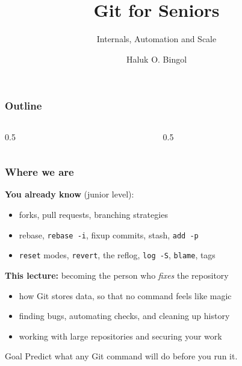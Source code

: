\documentclass[aspectratio=169,10pt,compress]{beamer}
\title{Git for Seniors}
\subtitle{Internals, Automation and Scale}
\author[Bingol]{Haluk O. Bingol}
\institute[FCIS]{
    Faculty of Computer and Information Sciences\\
    Yeditepe University
}
\date{
	{\tiny \hbTimeStamp}
}
\newcommand{\cmd}[1]{\texttt{\color{gitred}#1}}
\begin{document}
\begin{frame}[t,fragile]
  \titlepage
\end{frame}

\begin{frame}[t,fragile] \frametitle{Outline}
  \begin{columns}[T]
    \begin{column}{0.5\textwidth}
      \tableofcontents[sections={1-6}]
    \end{column}
    \begin{column}{0.5\textwidth}
      \tableofcontents[sections={7-12}]
    \end{column}
  \end{columns}
\end{frame}

\begin{frame}[t,fragile] \frametitle{Where we are}
  \textbf{You already know} (junior level):
  \begin{itemize}
    \item forks, pull requests, branching strategies
    \item rebase, \cmd{rebase -i}, fixup commits, stash, \cmd{add -p}
    \item \cmd{reset} modes, \cmd{revert}, the reflog, \cmd{log -S}, \cmd{blame}, tags
  \end{itemize}

  \vspace{0.5em}
  \textbf{This lecture:} becoming the person who \emph{fixes} the repository
  \begin{itemize}
    \item how Git stores data, so that no command feels like magic
    \item finding bugs, automating checks, and cleaning up history
    \item working with large repositories and securing your work
  \end{itemize}

  \vspace{0.5em}
  \begin{block}{Goal}
    Predict what any Git command will do before you run it.
  \end{block}
\end{frame}
\end{document}

